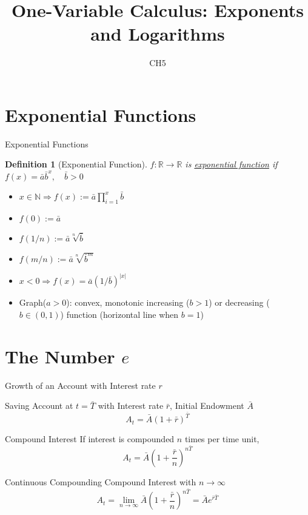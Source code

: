 \documentclass[final]{beamer}
\author[조남운]{\mail}
\title{One-Variable Calculus: Exponents and Logarithms}
\subtitle{CH5}
\newtheorem{defn}{Definition}
\begin{document}
	
\maketitle


\section{Exponential Functions} %
\label{sec:exponential_functions}
\begin{frame}[t]{Exponential Functions}
	\begin{defn}
		[Exponential Function]
		$f:\mathbb{R}\rightarrow\mathbb{R}$ is \uline{exponential function} if $f(x)=\bar a \bar b^x,\quad \bar b>0$
	\end{defn}
	\begin{itemize}
		\item $x\in\mathbb{N}\Rightarrow f(x):=\bar a \prod_{i=1}^x \bar b$
		\item $f(0) := \bar a$
		\item $f(1/n):= \bar a \sqrt[n]{\bar b}$
		\item $f(m/n):= \bar a \sqrt[n]{\bar b^m}$
		\item $x<0 \Rightarrow f(x)=\bar a (1/\bar b)^{|x|}$
		\item Graph($a>0$): convex, monotonic increasing ($b>1$) or decreasing ($b\in(0,1)$) function (horizontal line when $b=1$)
	\end{itemize}
\end{frame}

\section{The Number $e$} %
\label{sec:the_number_e}
\begin{frame}[t]{Growth of an Account with Interest rate $r$}
	\begin{block}
		{Saving Account at $t=\bar T$ with Interest rate $\bar r$, Initial Endowment $\bar A$}
		\[
			A_t = \bar A \left(1+\bar r\right)^{\bar T}
		\]
	\end{block}
	\begin{block}
		{Compound Interest} If interest is compounded $n$ times per time unit, 
		\[
			A_t = \bar A \left(1+\frac{\bar r}{n}\right)^{n\bar T}
		\]
	\end{block}
	\begin{block}
		{Continuous Compounding} Compound Interest with $n\rightarrow \infty$
		\[
			A_t = \lim_{n\rightarrow \infty}\bar A \left(1+\frac{\bar r}{n}\right)^{n\bar T} = \bar A e^{\bar r\bar T}
		\]
	\end{block}
\end{frame}
\end{document}
